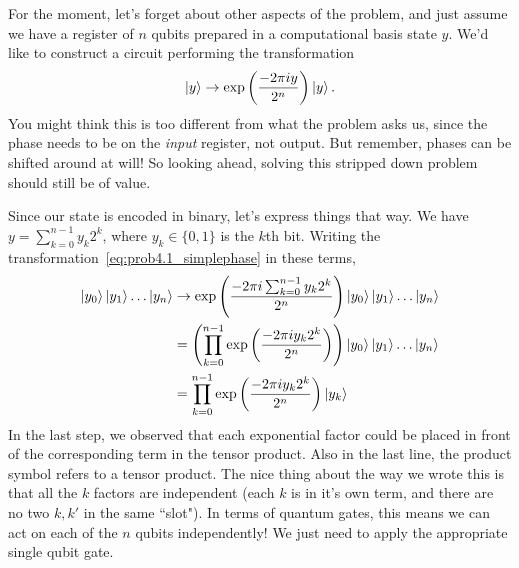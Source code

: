 \documentclass{book}
\begin{document}
    For the moment, let's forget about other aspects of the problem, and just assume we have a register of $n$ qubits prepared in a computational basis state $y$. We'd like to construct a circuit performing the transformation
    \begin{align} \label{eq:prob4.1_simplephase}
        \ket{y} \rightarrow \exp\left(\frac{-2\pi i y}{2^n}\right) \ket{y}.
    \end{align}
    You might think this is too different from what the problem asks us, since the phase needs to be on the \emph{input} register, not output. But remember, phases can be shifted around at will! So looking ahead, solving this stripped down problem should still be of value.

    Since our state is encoded in binary, let's express things that way. We have $y = \sum_{k=0}^{n-1} y_k 2^k$, where $y_k \in \{0,1\}$ is the $k$th bit. Writing the transformation~\eqref{eq:prob4.1_simplephase} in these terms, 
    \begin{align} \label{eq:prob4.1_factorize}
    \begin{aligned}
        \ket{y_0}\ket{y_1}\dots \ket{y_n} &\rightarrow \exp\left(\frac{-2\pi i \sum_{k=0}^{n-1} y_k 2^k}{2^n}\right) \ket{y_0}\ket{y_1}\dots \ket{y_n} \\
        &= \left(\prod_{k=0}^{n-1} \exp\left(\frac{-2\pi i y_k 2^k}{2^n}\right)\right) \ket{y_0}\ket{y_1}\dots \ket{y_n} \\
        &= \prod_{k=0}^{n-1} \exp\left(\frac{-2\pi i y_k 2^k}{2^n}\right) \ket{y_k}
    \end{aligned}
    \end{align}
    In the last step, we observed that each exponential factor could be placed in front of the corresponding term in the tensor product. Also in the last line, the product symbol refers to a tensor product. The nice thing about the way we wrote this is that all the $k$ factors are independent (each $k$ is in it's own term, and there are no two $k, k'$ in the same ``slot"). In terms of quantum gates, this means we can act on each of the $n$ qubits independently! We just need to apply the appropriate single qubit gate.
\end{document}
